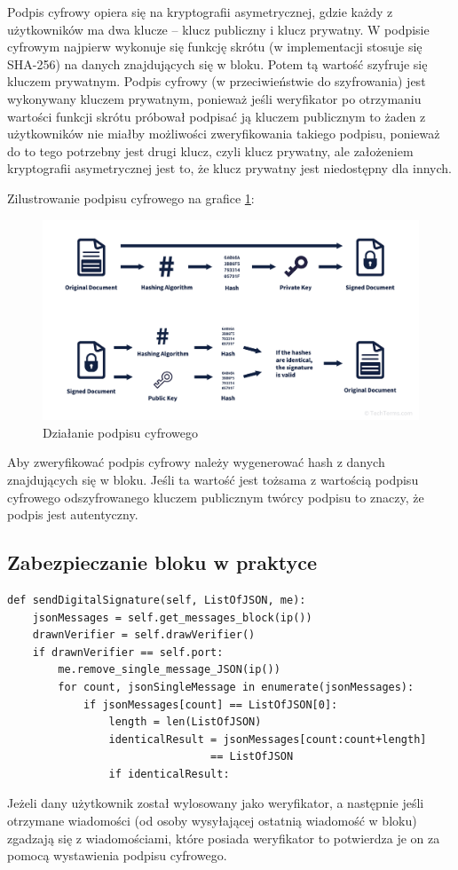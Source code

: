 Podpis cyfrowy opiera się na kryptografii asymetrycznej, gdzie każdy z użytkowników ma dwa klucze – klucz publiczny i klucz prywatny. W podpisie cyfrowym najpierw wykonuje się funkcję skrótu (w implementacji stosuje się SHA-256) na danych znajdujących się w bloku. Potem tą wartość szyfruje się kluczem prywatnym. Podpis cyfrowy (w przeciwieństwie do szyfrowania) jest wykonywany kluczem prywatnym, ponieważ jeśli weryfikator po otrzymaniu wartości funkcji skrótu próbował podpisać ją kluczem publicznym to żaden z użytkowników nie miałby możliwości zweryfikowania takiego podpisu, ponieważ do to tego potrzebny jest drugi klucz, czyli klucz prywatny, ale założeniem kryptografii asymetrycznej jest to, że klucz prywatny jest niedostępny dla innych. 

Zilustrowanie podpisu cyfrowego na grafice \ref{fig:DSJP}:
\begin{figure}[H]
    \centering
    \includegraphics[width=\textwidth]{Images/DSJPG.jpg}
    \caption{Działanie podpisu cyfrowego}
    \label{fig:DSJP}
\end{figure}

Aby zweryfikować podpis cyfrowy należy wygenerować hash z danych znajdujących się w bloku. Jeśli ta wartość jest tożsama z wartością podpisu cyfrowego odszyfrowanego kluczem publicznym twórcy podpisu to znaczy, że podpis jest autentyczny.

\subsection{Zabezpieczanie bloku w praktyce}

\begin{lstlisting}[caption={Wysyłanie podpisu elektronicznego}]
def sendDigitalSignature(self, ListOfJSON, me):
    jsonMessages = self.get_messages_block(ip())
    drawnVerifier = self.drawVerifier()
    if drawnVerifier == self.port:
        me.remove_single_message_JSON(ip())
        for count, jsonSingleMessage in enumerate(jsonMessages):
            if jsonMessages[count] == ListOfJSON[0]:
                length = len(ListOfJSON)
                identicalResult = jsonMessages[count:count+length]
                                == ListOfJSON
                if identicalResult:
\end{lstlisting}
Jeżeli dany użytkownik został wylosowany jako weryfikator, a następnie jeśli otrzymane wiadomości (od osoby wysyłającej ostatnią wiadomość w bloku) zgadzają się z wiadomościami, które posiada weryfikator to potwierdza je on za pomocą wystawienia podpisu cyfrowego.

